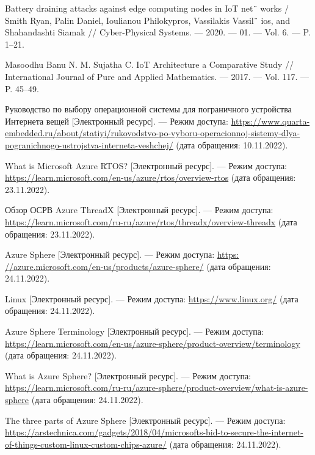 \begin{thebibliography}{}
	Battery draining attacks against edge computing nodes in IoT net¨
	works / Smith Ryan, Palin Daniel, Ioulianou Philokypros, Vassilakis Vassil¨
	ios, and Shahandashti Siamak // Cyber-Physical Systems. — 2020. — 01. —
	Vol. 6. — P. 1–21.
	
	Masoodhu Banu N. M. Sujatha C. IoT Architecture a Comparative
	Study // International Journal of Pure and Applied Mathematics. — 2017. —
	Vol. 117. — P. 45–49.
	
	Руководство по выбору операционной системы для пограничного устройства Интернета вещей [Электронный ресурс]. — Режим доступа: \url{https://www.quarta-embedded.ru/about/statiyi/rukovodstvo-po-vyboru-operacionnoj-sistemy-dlya-pogranichnogo-ustrojstva-interneta-veshchej/} (дата обращения: 10.11.2022).
	
	What is Microsoft Azure RTOS? [Электронный ресурс]. — Режим доступа: \url{https://learn.microsoft.com/en-us/azure/rtos/overview-rtos} (дата обращения: 23.11.2022).
	
	Обзор ОСРВ Azure ThreadX [Электронный ресурс]. — Режим доступа: \url{https://learn.microsoft.com/ru-ru/azure/rtos/threadx/overview-threadx} (дата обращения: 23.11.2022).
	
	Azure Sphere [Электронный ресурс]. — Режим доступа: \url{https:
	//azure.microsoft.com/en-us/products/azure-sphere/} (дата обращения:
	24.11.2022).
	
	Linux [Электронный ресурс]. — Режим доступа: \url{https://www.linux.org/} (дата обращения: 24.11.2022).
	
	Azure Sphere Terminology [Электронный ресурс]. — Режим доступа: \url{https://learn.microsoft.com/en-us/azure-sphere/product-overview/terminology} (дата обращения: 24.11.2022).
	
	What is Azure Sphere? [Электронный ресурс]. — Режим доступа: \url{https://learn.microsoft.com/ru-ru/azure-sphere/product-overview/what-is-azure-sphere} (дата обращения: 24.11.2022).
	
	The three parts of Azure Sphere [Электронный ресурс]. —
	Режим доступа: \url{https://arstechnica.com/gadgets/2018/04/microsofts-bid-to-secure-the-internet-of-things-custom-linux-custom-chips-azure/}
	(дата обращения: 24.11.2022).
	

\end{thebibliography}
